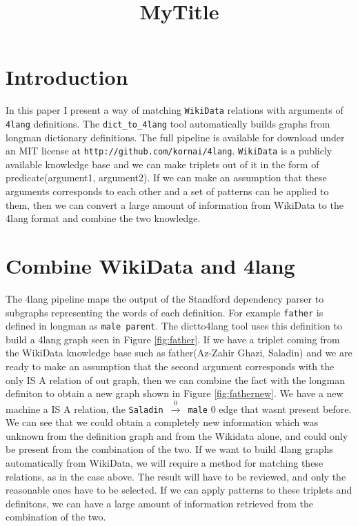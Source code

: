 \documentclass[10pt, a4paper]{article}
\title{MyTitle}
\begin{document}
\maketitleabstract

\section{Introduction}

In this paper I present a way of matching \texttt{WikiData} relations with arguments of \texttt{4lang} definitions. The \texttt{dict\_to\_4lang} tool automatically builds graphs from longman dictionary definitions. The full pipeline is
available for download under an MIT license at \texttt{http://github.com/kornai/4lang}. \texttt{WikiData} is a publicly available knowledge base and we can make triplets out of it in the form of predicate(argument1, argument2). If we can make an assumption that these arguments corresponds to each other and a set of patterns can be applied to them, then we can  convert a large amount of information from WikiData to the 4lang format and combine the two knowledge.


\section{Combine WikiData and 4lang}
\label{sec:Combine WikiData and 4lang}
The 4lang pipeline maps the output of the Standford dependency parser to subgraphs representing the words of each definition.  For example \texttt{father} is defined in longman as 
\texttt{male parent}. 
The dictto4lang tool uses this definition to build a 4lang graph seen in Figure \ref{fig:father}. If we have a triplet coming from the WikiData knowledge base such as father(Az-Zahir Ghazi, Saladin) and we are ready to make an assumption that the second argument corresponds with the only IS A relation of out graph, then we can combine the fact with the longman definiton to obtain a new graph shown in Figure \ref{fig:fathernew}. We have a new machine a IS A relation, the \texttt{Saladin}~$\xrightarrow0$~\texttt{male} 0 edge that wasnt present before. We can see that we could obtain a completely new information which was unknown from the definition graph and from the Wikidata alone, and could only be present from the combination of the two.
If we want to build 4lang graphs automatically from WikiData, we will require a method for matching these relations, as in the case above. The result will have to be reviewed, and only the reasonable ones have to be selected. If we can apply patterns to these triplets and definitons, we can have a large amount of information retrieved from the combination of the two.
\end{document}
